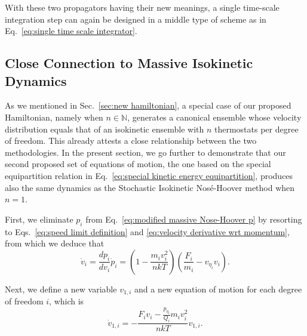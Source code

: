\documentclass[
aip,
jcp,
reprint,
]{revtex4-1}
\newcommand{\nn}{n}
\begin{document}
With these two propagators having their new meanings, a single time-scale integration step can again be designed in a middle type of scheme as in Eq.~\eqref{eq:single time scale integrator}.

\subsection{Close Connection to Massive Isokinetic Dynamics}
\label{sec:modified NHC thermostatting}

As we mentioned in Sec.~\ref{sec:new hamiltonian}, a special case of our proposed Hamiltonian, namely when $n \in \mathbb{N}$, generates a canonical ensemble whose velocity distribution equals that of an isokinetic ensemble \cite{Abreu_2020} with $\nn$ thermostats per degree of freedom.
This already attests a close relationship between the two methodologies.
In the present section, we go further to demonstrate that our second proposed set of equations of motion, the one based on the special equipartition relation in Eq.~\eqref{eq:special kinetic energy equipartition}, produces also the same dynamics as the Stochastic Isokinetic Nos\'e-Hoover method \cite{Leimkuhler_2013} when $\nn = 1$.

First, we eliminate $p_i$ from Eq.~\eqref{eq:modified massive Nose-Hoover p} by resorting to Eqs.~\eqref{eq:speed limit definition} and \eqref{eq:velocity derivative wrt momentum}, from which we deduce that
\begin{equation}
\label{eq:velocity equation}
\dot{v}_i = \frac{dp_i}{dv_i} \dot{p}_i = \left(1 - \frac{m_i v_i^2}{\nn k T}\right) \left(\frac{F_i}{m_i} - v_{\eta_i} v_i\right).
\end{equation}

Next, we define a new variable $v_{1,i}$ and a new equation of motion for each degree of freedom $i$, which is
\begin{equation}
\label{eq:new driven variable equation}
\dot{v}_{1,i} = -\frac{F_i v_i - \frac{p_{\eta_i}}{Q_i} m_i v_i^2}{\nn kT} v_{1,i}.
\end{equation}
\end{document}
